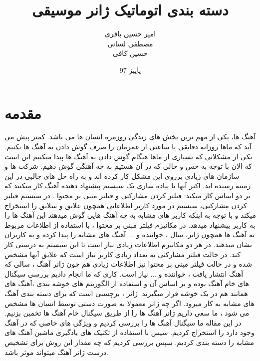 \documentclass[conference]{IEEEtran}
\title{دسته بندی اتوماتیک ژانر موسیقی   }
\author{
امیر حسین باقری\\
مصطفی لسانی\\
حسین کافی
}
\date{پاییز 97}
\begin{document}
\maketitle

\section{مقدمه} 
آهنگ ها، یکی از مهم ترین بخش های زندگی روزمره انسان ها می باشد. کمتر پیش می آید که ماها روزانه دقایقی یا ساعتی از عمرمان را صرف گوش دادن به آهنگ ها نکنیم. یکی از مشکلاتی که بسیاری از ماها هنگام گوش دادن به آهنگ ها پیدا میکنیم این است که الان با توجه به حس و حالی که در آن هستیم به چه آهنگی گوش دهیم.
شرکت ها و سازمان های زیادی برروی این مشکل کار کرده اند و به راه حل های جالبی در این زمینه رسیده اند. اکثر آنها با پیاده سازی یک سیستم پیشنهاد دهنده آهنگ کار میکنند که بر دو اساس کار میکند: فیلتر کردن مشارکتی  و  فیلتر مبنی بر محتوا . در سیستم فیلتر کردن مشارکتی، سیستم در مورد کاربر اطلاعاتی همچون علایق و سلایق را استخراج میکند و با توجه به اینکه کاربر های مشابه به چه آهنگ هایی گوش میدهند این آهنگ ها را به کاربر پیشنهاد میدهد. در مکانیزم فیلتر مبنی بر محتوا ، با استفاده از اطلاعات مربوط به آهنگ ها همچون ژانر، سال ، خواننده و ... آهنگ های مشابه را پیدا کرده و به کاربران نشان میدهند. در هر دو مکانیزم اطلاعات زیادی نیاز است تا این سیستم به درستی کار کند. در حالت فیلتر مشارکتی به تعداد زیادی کاربر نیاز است که علایق آنها مشخص شده و در حالت فیلتر مبنی بر محتوا نیز اطلاعات زیادی هم چون ژانر آهنگ ، سالی که آهنگ انتشار یافت ، خواننده و ... نیاز است. کاری که ما انجام دادیم بررسی سیگنال های خام آهنگ بوده و بر اساس آن و استفاده از الگوریتم های خوشه بندی ،آهنگ های همانند هم در یک خوشه قرار میگیرند. 
ژانر ، برچسبی است که برای دسته بندی آهنگ های مشابه به کار میرود. اگر چه ژانر معمولا به صورت دستی توسط انسان ها مشخص می شود ، ما سعی داریم ژانر آهنگ ها را از طریق سیگنال خام آهنگ ها تخمین بزنیم. در این مقاله ما سیگنال آهنگ ها را بررسی کردیم و ویژگی های خاصی که در آهنگ وجود دارد را استخراج کردیم. سپس با استفاده از تکنیک های یادگیری ماشین آهنگ های مشابه را دسته بندی کردیم. سپس بررسی کردیم که چه مقدار این روش برای تشخیص درست ژانر آهنگ میتواند موثر باشد.
\end{document}
